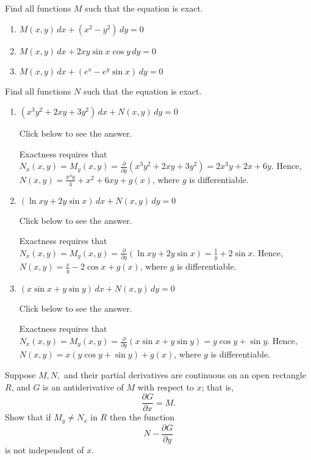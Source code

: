 \documentclass{ximera}
\begin{document}
\begin{problem}\label{exer:2.5.29}
Find all functions $M$ such that the equation is exact.
\begin{enumerate}
\item %
$M(x,y)\,dx+(x^2-y^2)\,dy=0$

\item %
$M(x,y)\,dx+2xy\sin x\cos y\,dy=0$

\item %
$M(x,y)\,dx+(e^x-e^y\sin x)\,dy=0$
\end{enumerate}
\end{problem}

\begin{problem}\label{exer:2.5.30}
Find all functions $N$ such that the  equation is exact.
\begin{enumerate}
\item %
$(x^3y^2+2xy+3y^2)\,dx+N(x,y)\,dy=0$

Click below to see the answer.

\begin{expandable}
    Exactness requires that
$N_x(x,y)=M_y(x,y)=\frac{\partial}{\partial
y}(x^3y^2+2xy+3y^2)=2x^3y+2x+6y$.
 Hence, $N(x,y)=\frac{x^4y}{4}+x^2+6xy+g(x)$,
where $g$ is  differentiable.
\end{expandable}

\item %
$(\ln xy+2y\sin x)\,dx+N(x,y)\,dy=0$

Click below to see the answer.

\begin{expandable}
    Exactness requires that
$N_x(x,y)=M_y(x,y)=\frac{\partial}{\partial y}(\ln xy+2y\sin
x)=\frac{1}{y}+2\sin x$.
 Hence, $N(x,y)=\frac{x}{y}-2\cos x+g(x)$,
where $g$ is  differentiable.
\end{expandable}
\item %
$(x\sin x+y\sin y)\,dx+N(x,y)\,dy=0$

Click below to see the answer.

\begin{expandable}
    Exactness requires that
$N_x(x,y)=M_y(x,y)=\frac{\partial}{\partial y}(x\sin x+y\sin
y)=y\cos y+\sin y$.
 Hence, $N(x,y)=x(y\cos y+\sin y)+g(x)$,
where $g$ is  differentiable.
\end{expandable}
\end{enumerate}


\end{problem}

\begin{problem}\label{exer:2.5.31}
Suppose $M,N,$ and their partial derivatives are continuous on
an open rectangle $R$, and $G$ is an antiderivative of $M$ with respect to $x$; that is,
$$
\frac{\partial G}{\partial x}=M.
$$
Show that if $M_y\ne N_x$ in $R$ then the function
$$
 N-\frac{\partial  G}{\partial y}
$$
is not independent of $x$.
\end{problem}
\end{document}
